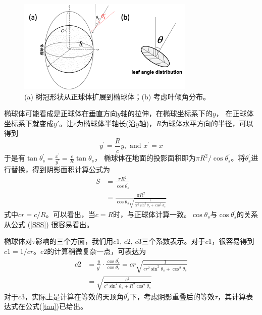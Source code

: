  {
    \begin{figure}[]
    \centering
    \includegraphics{Figures/辐射过程及辐射通量计算/椭球体树冠.png}
    \caption{(a) 树冠形状从正球体扩展到椭球体；(b) 考虑叶倾角分布。}
    \label{fig:椭球体树冠}
    \end{figure}
    }
    

椭球体可能看成是正球体在垂直方向$y$轴的拉伸，在椭球坐标系下的$y$，
在正球体坐标系下就变成$y\prime$。让$c$为椭球体半轴长(沿$y$轴)，$R$为球体水平方向的半径，可以得到
\begin{equation}
y^{\prime}=\frac{R}{c} y, \text { and } x^{\prime}=x
\end{equation}
于是有$\tan{\theta_s^\prime}=\frac{x^\prime}{y^\prime}=\frac{c}{R}{\tan{\theta}}_s$，
椭球体在地面的投影面积即为$\pi R^2/\cos{\theta_s^\prime}$。将$\theta_s^\prime$进行替换，得到阴影面积计算公式为
\begin{equation}\label{SSS}
\begin{aligned} S &=\frac{\pi R^{2}}{\cos \theta_{s}^{\prime}} \\ &=\frac{\pi R^{2}}{\cos \theta_{s} 
\sqrt{\frac{1}{c r^{2} \sin ^{2} \theta_{s}+\cos ^{2} \theta_{s}}}} \end{aligned}
\end{equation}
式中$cr=c/R$。可以看出，当$c=R$时，与正球体计算一致。$\cos{\theta_s}$与$\cos{\theta_s^\prime}$的关系从公式 (\ref{SSS}) 很容易看出。%


椭球体对$\tau$影响的三个方面，我们用$c1$, $c2$, $c3$三个系数表示。对于$c1$，很容易得到$c1=1/cr$。$c2$的计算稍微复杂一点，可表达为
\begin{equation}
\begin{aligned} c 2 &=\frac{y}{y^{\prime}} \cdot \frac{\cos \theta_{s}^{\prime}}{\cos \theta_{s}}=
    c r \sqrt{\frac{1}{c r^{2} \sin ^{2} \theta_{s}+\cos ^{2} \theta_{s}}} \\ &=
    \sqrt{\frac{c^{2}}{c^{2} \sin ^{2} \theta_{s}+R^{2} \cos ^{2} \theta_{s}}} \end{aligned}
\end{equation}
对于$c3$，实际上是计算在等效的天顶角$\theta_s^\prime$下，考虑阴影重叠后的等效$\tau$，其计算表达式在公式(\ref{tau})已给出。


